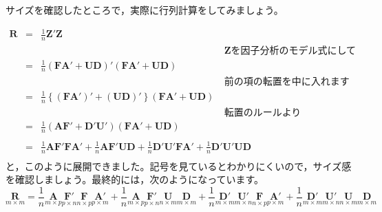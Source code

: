 \documentclass{ltjsbook}
\begin{document}
サイズを確認したところで，実際に行列計算をしてみましょう。

\begin{equation}
	\begin{array}{lll}
		\bm{R} & = & \frac{1}{n} \bm{Z}'\bm{Z}                                                                                                                                                      \\
		       &   & \hspace{8cm}\text{$\bm{Z}$を因子分析のモデル式にして}                                                                                                                                       \\
		       & = & \frac{1}{n}(\bm{F} \bm{A} ' + \bm{U} \bm{D})'(\bm{F} \bm{A} ' + \bm{U} \bm{D})                                                                                                 \\
		       &   & \hspace{8cm}\text{前の項の転置を中に入れます}                                                                                                                                               \\
		       & = & \frac{1}{n}\left \{ (\bm{F} \bm{A} ')'+(\bm{U} \bm{D})' \right \}(\bm{F} \bm{A} ' + \bm{U} \bm{D})                                                                             \\
		       &   & \hspace{8cm}\text{転置のルールより}                                                                                                                                                    \\
		       & = & \frac{1}{n}(\bm{A} \bm{F} ' + \bm{D}' \bm{U} ')(\bm{F} \bm{A} ' + \bm{U} \bm{D})                                                                                               \\
		       &   & \hspace{8cm}                                                                                                                                                                   \\
		       & = & \frac{1}{n}\bm{A} \bm{F}' \bm{F} \bm{A}' + \frac{1}{n} \bm{A} \bm{F}' \bm{U} \bm{D} + \frac{1}{n} \bm{D}' \bm{U} ' \bm{F} \bm{A} ' + \frac{1}{n} \bm{D}' \bm{U}' \bm{U} \bm{D} \\
	\end{array}
\end{equation}
と，このように展開できました。記号を見ているとわかりにくいので，サイズ感を確認しましょう。最終的には，次のようになっています。
\[
	\underset{m \times m}{\bm{R}} =
	\frac{1}{n} \underset{m \times p}{\bm{A}} \underset{p \times n}{\bm{F}'} \underset{n \times p}{\bm{F}} \underset{p \times m}{\bm{A}'} +
	\frac{1}{n} \underset{m \times p}{\bm{A}} \underset{p \times n}{\bm{F}'} \underset{n \times m}{\bm{U}} \underset{m \times m}{\bm{D}} +
	\frac{1}{n} \underset{m \times m}{\bm{D}'} \underset{m \times n}{\bm{U}'} \underset{n \times p}{\bm{F}} \underset{p \times m}{\bm{A}'} +
	\frac{1}{n} \underset{m \times m}{\bm{D}'} \underset{m \times n}{\bm{U}'} \underset{n \times m}{\bm{U}} \underset{m \times m}{\bm{D}}
\]
\end{document}
